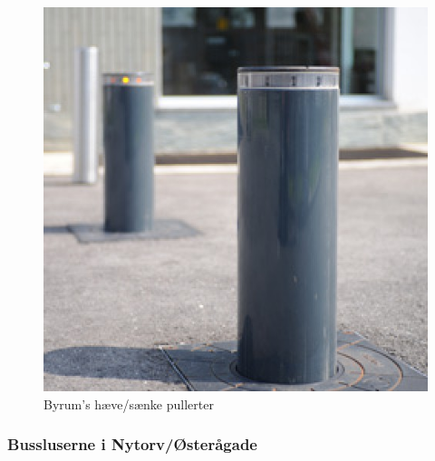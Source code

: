 \begin{figure}[htbp]
  \centering
  \begin{adjustbox}{max width=\textwidth}
    \includegraphics{figures/Billederogfigur/1.jpg}
 \end{adjustbox}
  \caption{Byrum's hæve/sænke pullerter}
   \label{fig:byrum_pullerter}
\end{figure}



        
\subsubsection{Bussluserne i Nytorv/Østerågade}
\label{bussluseinytorv}                                           
                                           

